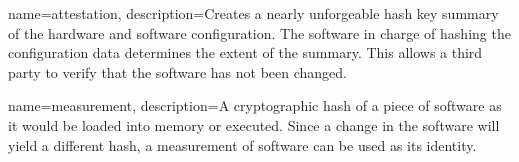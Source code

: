 {
        name=attestation,
        description={Creates a nearly unforgeable hash key summary of the hardware and software configuration. The software in charge of hashing the configuration data determines the extent of the summary. This allows a third party to verify that the software has not been changed.}
}

{
        name=measurement,
        description={A cryptographic hash of a piece of software as it would be loaded into memory or executed. Since a change in the software will yield a different hash, a measurement of software can be used as its identity.}
}

